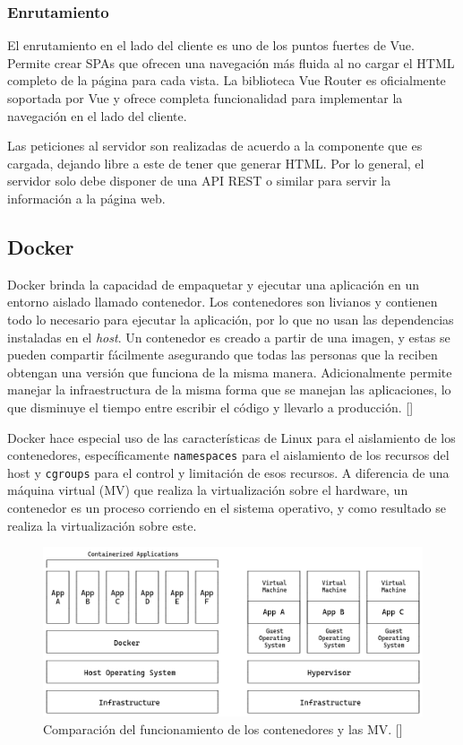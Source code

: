 \subsubsection{Enrutamiento} 

El enrutamiento en el lado del cliente es uno de los puntos fuertes de Vue. Permite crear SPAs que ofrecen una navegación más fluida al no cargar el HTML completo de la página para cada vista. La biblioteca Vue Router es oficialmente soportada por Vue y ofrece completa funcionalidad para implementar la navegación en el lado del cliente.

Las peticiones al servidor son realizadas de acuerdo a la componente que es cargada, dejando libre a este de tener que generar HTML. Por lo general, el servidor solo debe disponer de una API REST o similar para servir la información a la página web.

\subsection{Docker}

Docker brinda la capacidad de empaquetar y ejecutar una aplicación en un entorno aislado llamado contenedor. Los contenedores son livianos y contienen todo lo necesario para ejecutar la aplicación, por lo que no usan las dependencias instaladas en el \textit{host}. Un contenedor es creado a partir de una imagen, y estas se pueden compartir fácilmente asegurando que todas las personas que la reciben obtengan una versión que funciona de la misma manera. Adicionalmente permite manejar la infraestructura de la misma forma que se manejan las aplicaciones, lo que disminuye el tiempo entre escribir el código y llevarlo a producción. [\cite{docker-docs}]

Docker hace especial uso de las características de Linux para el aislamiento de los contenedores, específicamente \verb|namespaces| para el aislamiento de los recursos del host y \verb|cgroups| para el control y limitación de esos recursos. A diferencia de una máquina virtual (MV) que realiza la virtualización sobre el hardware, un contenedor es un proceso corriendo en el sistema operativo, y como resultado se realiza la virtualización sobre este.

\begin{figure}[!ht]
    \centering
    \includegraphics[width=\linewidth]{draws/cont-vs-vm.png}
    \caption{Comparación del funcionamiento de los contenedores y las MV. [\cite{docker-containers}]}
\end{figure}


